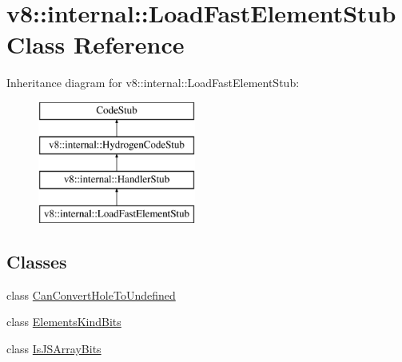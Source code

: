 \hypertarget{classv8_1_1internal_1_1_load_fast_element_stub}{}\section{v8\+:\+:internal\+:\+:Load\+Fast\+Element\+Stub Class Reference}
\label{classv8_1_1internal_1_1_load_fast_element_stub}
Inheritance diagram for v8\+:\+:internal\+:\+:Load\+Fast\+Element\+Stub\+:\begin{figure}[H]
\begin{center}
\leavevmode
\includegraphics[height=4.000000cm]{classv8_1_1internal_1_1_load_fast_element_stub}
\end{center}
\end{figure}
\subsection*{Classes}
\begin{DoxyCompactItemize}
\item 
class \hyperlink{classv8_1_1internal_1_1_load_fast_element_stub_1_1_can_convert_hole_to_undefined}{Can\+Convert\+Hole\+To\+Undefined}
\item 
class \hyperlink{classv8_1_1internal_1_1_load_fast_element_stub_1_1_elements_kind_bits}{Elements\+Kind\+Bits}
\item 
class \hyperlink{classv8_1_1internal_1_1_load_fast_element_stub_1_1_is_j_s_array_bits}{Is\+J\+S\+Array\+Bits}
\end{DoxyCompactItemize}
